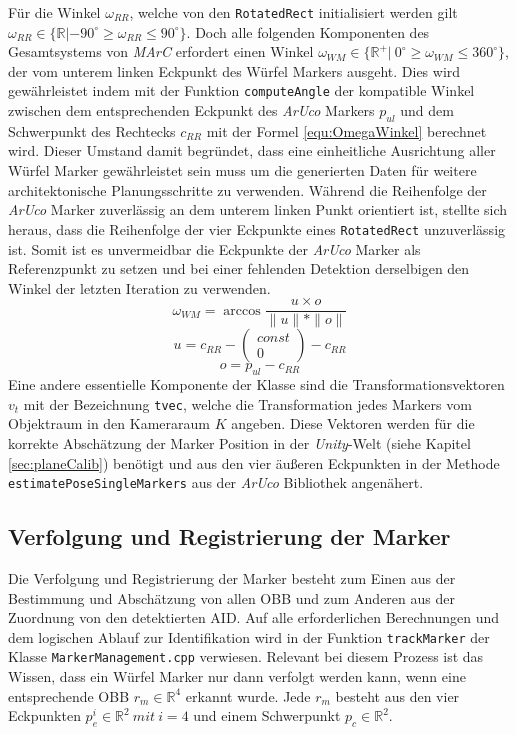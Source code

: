 Für die Winkel $\omega_{RR}$, welche von den \texttt{RotatedRect} initialisiert werden gilt $\omega_{RR} \in \{\mathbb{R} | -90^\circ \ge \omega_{RR} \le 90^\circ\}$. Doch alle folgenden Komponenten des Gesamtsystems von \textit{MArC} erfordert einen Winkel $\omega_{WM} \in \{\mathbb{R}^+ |\ 0 ^\circ \ge \omega_{WM} \le 360^\circ\}$, der vom unterem linken Eckpunkt des Würfel Markers ausgeht. Dies wird gewährleistet indem mit der Funktion \texttt{computeAngle} der kompatible Winkel zwischen dem entsprechenden Eckpunkt des \textit{ArUco} Markers $p_{ul}$ und dem Schwerpunkt des Rechtecks $c_{RR}$ mit der Formel \ref{equ:OmegaWinkel} berechnet wird. Dieser Umstand damit begründet, dass eine einheitliche Ausrichtung aller Würfel Marker gewährleistet sein muss um die generierten Daten für weitere architektonische Planungsschritte zu verwenden. Während die Reihenfolge der \textit{ArUco} Marker zuverlässig an dem unterem linken Punkt orientiert ist, stellte sich heraus, dass die Reihenfolge der vier Eckpunkte eines \texttt{RotatedRect} unzuverlässig ist. Somit ist es unvermeidbar die Eckpunkte der \textit{ ArUco} Marker als Referenzpunkt zu setzen und bei einer fehlenden Detektion derselbigen den Winkel der letzten Iteration zu verwenden. 
\begin{equation}
\label{equ:OmegaWinkel}
\omega_{WM} = \arccos \frac{u \times o}{\|u\|*\|o\|} 
\end{equation}
\begin{equation}
u = c_{RR} - \begin{pmatrix}
const\\ 0
\end{pmatrix}  -c_{RR}
\end{equation}
\begin{equation}
o=p_{ul}-c_{RR}
\end{equation}
Eine andere essentielle Komponente der Klasse sind die Transformationsvektoren $v_t$ mit der Bezeichnung \texttt{tvec}, welche die Transformation jedes Markers vom Objektraum in den Kameraraum $K$ angeben. Diese Vektoren werden für die korrekte Abschätzung der Marker Position in der \textit{Unity}-Welt (siehe Kapitel \ref{sec:planeCalib}) benötigt und aus den vier äußeren Eckpunkten in der Methode \texttt{estimatePoseSingleMarkers} aus der \textit{ArUco} Bibliothek angenähert. 

\subsection{Verfolgung und Registrierung der Marker}
Die Verfolgung und Registrierung der Marker besteht zum Einen aus der Bestimmung und Abschätzung von allen OBB und zum Anderen aus der Zuordnung von den detektierten AID. Auf alle erforderlichen Berechnungen und dem logischen Ablauf zur Identifikation wird in der Funktion \texttt{trackMarker} der Klasse \texttt{MarkerManagement.cpp} verwiesen. Relevant bei diesem Prozess ist das Wissen, dass ein Würfel Marker nur dann verfolgt werden kann, wenn eine entsprechende OBB $r_m \in \mathbb{R}^4$ erkannt wurde. Jede $r_m$ besteht aus den vier Eckpunkten $p_e^i \in \mathbb{R}^2 \ mit \ i=4$ und einem Schwerpunkt $p_c \in \mathbb{R}^2$.

